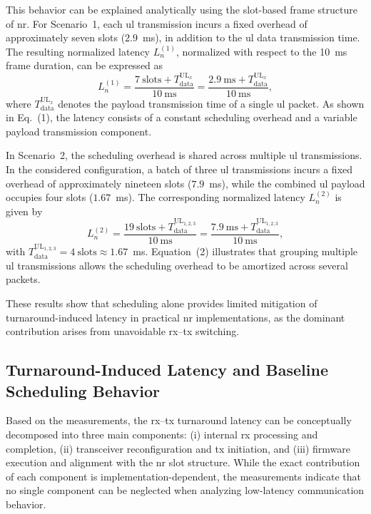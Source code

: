 \documentclass[conference]{IEEEtran}
\begin{document}
This behavior can be explained analytically using the slot-based frame structure of \gls{nr}. 
For Scenario~1, each \gls{ul} transmission incurs a fixed overhead of approximately seven slots ($2.9$~ms), in addition to the \gls{ul} data transmission time. The resulting normalized latency $L_n^{(1)}$, normalized with respect to the 10~ms frame duration, can be expressed as
\begin{equation}
L_n^{(1)} =
\frac{7~\text{slots} + T_{\text{data}}^{\text{UL}_x}}{10~\text{ms}}
=
\frac{2.9~\text{ms} + T_{\text{data}}^{\text{UL}_x}}{10~\text{ms}},
\end{equation}
where $T_{\text{data}}^{\text{UL}_x}$ denotes the payload transmission time of a single \gls{ul} packet. 
As shown in Eq.~(1), the latency consists of a constant scheduling overhead and a variable payload transmission component.

In Scenario~2, the scheduling overhead is shared across multiple \gls{ul} transmissions. In the considered configuration, a batch of three \gls{ul} transmissions incurs a fixed overhead of approximately nineteen slots ($7.9$~ms), while the combined \gls{ul} payload occupies four slots ($1.67$~ms). The corresponding normalized latency $L_n^{(2)}$ is given by
\begin{equation}
L_n^{(2)} =
\frac{19~\text{slots} + T_{\text{data}}^{\text{UL}_{1,2,3}}}{10~\text{ms}}
=
\frac{7.9~\text{ms} + T_{\text{data}}^{\text{UL}_{1,2,3}}}{10~\text{ms}},
\end{equation}
with $T_{\text{data}}^{\text{UL}_{1,2,3}} = 4~\text{slots} \approx 1.67$~ms. 
Equation~(2) illustrates that grouping multiple \gls{ul} transmissions allows the scheduling overhead to be amortized across several packets.

These results show that scheduling alone provides limited mitigation of turnaround-induced latency in practical \gls{nr} implementations, as the dominant contribution arises from unavoidable \gls{rx}--\gls{tx} switching.



\subsection{Turnaround-Induced Latency and Baseline Scheduling Behavior}

Based on the measurements, the \gls{rx}--\gls{tx} turnaround latency can be conceptually decomposed into three main components: (i) internal \gls{rx} processing and completion, (ii) transceiver reconfiguration and \gls{tx} initiation, and (iii) firmware execution and alignment with the \gls{nr} slot structure. While the exact contribution of each component is implementation-dependent, the measurements indicate that no single component can be neglected when analyzing low-latency communication behavior.
\end{document}
